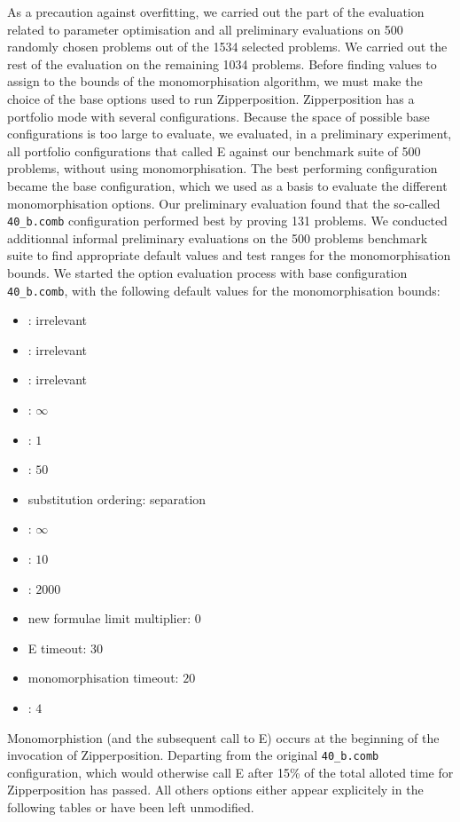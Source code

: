 \documentclass[]{ceurart}
\begin{document}
As a precaution against overfitting, we carried out the part of the evaluation related to parameter optimisation and all preliminary evaluations on 500 randomly chosen problems out of the 1534 selected problems. We carried out the rest of the evaluation on the remaining 1034 problems. Before finding values to assign to the bounds of the monomorphisation algorithm, we must make the choice of the base options used to run Zipperposition. Zipperposition has a portfolio mode with several configurations. Because the space of possible base configurations is too large to evaluate, we evaluated, in a preliminary experiment, all portfolio configurations that called E against our benchmark suite of 500 problems, without using monomorphisation. The best performing configuration became the base configuration, which we used as a basis to evaluate the different monomorphisation options. Our preliminary evaluation found that the so-called \verb|40_b.comb| configuration performed best by proving 131 problems.
We conducted additionnal informal preliminary evaluations on the 500 problems benchmark suite to find appropriate default values and test ranges for the monomorphisation bounds. We started the option evaluation process with base configuration \verb|40_b.comb|, with the following default values for the monomorphisation bounds:

\begin{multicols}{2}%
\begin{itemize}
   \item \MonoCap: irrelevant
   \item \MonoMult: irrelevant
   \item \MonoFloor: irrelevant
   \item \PolyCap: \(\infty\)
   \item \PolyMult: \(1\)
   \item \PolyFloor: \(50\)
   \item substitution ordering: separation
   \item \SubstLimit: \(\infty\)
   \item \MonoSubstsLimit: \(10\)
   \item \Limit: \(2000\)
   \item new formulae limit multiplier: \(0\)
   \item E timeout: \(30\)
   \item monomorphisation timeout: \(20\)
   \item \Loop: \(4\)
\end{itemize}
\end{multicols}
Monomorphistion (and the subsequent call to E) occurs at the beginning of the invocation of Zipperposition. Departing from the original \verb|40_b.comb| configuration, which would otherwise call E after 15\% of the total alloted time for Zipperposition has passed. All others options either appear explicitely in the following tables or have been left unmodified.
\end{document}
